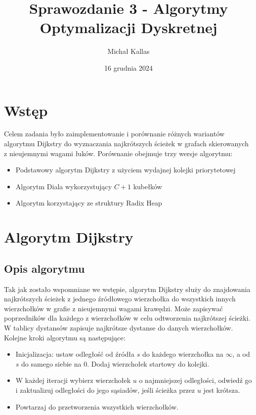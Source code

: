 \documentclass{article}
\title{Sprawozdanie 3 - Algorytmy Optymalizacji Dyskretnej}
\author{Michał Kallas}
\date{16 grudnia 2024}
\begin{document}
\maketitle

\section{Wstęp}
Celem zadania było zaimplementowanie i porównanie różnych wariantów algorytmu Dijkstry do wyznaczania najkrótszych ścieżek w grafach skierowanych z nieujemnymi wagami łuków.
Porównanie obejmuje trzy wersje algorytmu:
\begin{itemize}
    \item Podstawowy algorytm Dijkstry z użyciem wydajnej kolejki priorytetowej
    \item Algorytm Diala wykorzystujący $C+1$ kubełków
    \item Algorytm korzystający ze struktury Radix Heap
\end{itemize}

\section{Algorytm Dijkstry}

\subsection{Opis algorytmu}
Tak jak zostało wspomniane we wstępie, algorytm Dijkstry służy do znajdowania najkrótszych ścieżek z jednego źródłowego wierzchołka do wszystkich innych wierzchołków w grafie z nieujemnymi wagami krawędzi.
Może zapisywać poprzedników dla każdego z wierzchołków w celu odtworzenia najkrótszej ścieżki.
W tablicy dystansów zapisuje najkrótsze dystanse do danych wierzchołków. \\

\noindent Kolejne kroki algorytmu są następujące:

\begin{itemize}
    \item Inicjalizacja: ustaw odległość od źródła \( s \) do każdego wierzchołka na \( \infty \), a od \( s \) do samego siebie na 0. Dodaj wierzchołek startowy do kolejki.
    \item W każdej iteracji wybierz wierzchołek \( u \) o najmniejszej odległości, odwiedź go i zaktualizuj odległości do jego sąsiadów, jeśli ścieżka przez \( u \) jest krótsza.
    \item Powtarzaj do przetworzenia wszystkich wierzchołków.
\end{itemize}
\end{document}

